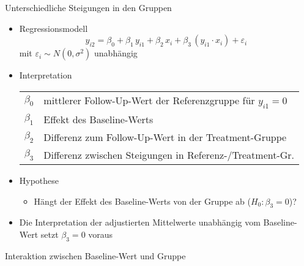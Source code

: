\documentclass{beamer}
\begin{document}
\begin{frame}{Unterschiedliche Steigungen in den Gruppen}
\begin{itemize}
  \item Regressionsmodell
    {\color{iwmorange}\[
      y_{i2} = \beta_0 + \beta_1 \, y_{i1} + \beta_2 \, x_i +
               \beta_3 \, (y_{i1} \cdot x_i) + \varepsilon_i
    \]}
    mit $\varepsilon_i \sim N(0, \sigma^2)$ unabhängig
  \item Interpretation
    \begin{center}
    \begin{tabular}{lp{10cm}}
    $\beta_0$ & mittlerer Follow-Up-Wert der Referenzgruppe für $y_{i1} = 0$\\
    $\beta_1$ & Effekt des Baseline-Werts\\
    $\beta_2$ & Differenz zum Follow-Up-Wert in der Treatment-Gruppe\\
    $\beta_3$ & Differenz zwischen Steigungen in Referenz-/Treatment-Gr.
    \end{tabular}
    \end{center}
  \item Hypothese
    \begin{itemize}
        \item Hängt der Effekt des Baseline-Werts von der Gruppe ab ($H_0\colon \beta_3 = 0$)?
    \end{itemize}
  \item Die Interpretation der adjustierten Mittelwerte unabhängig vom Baseline-Wert setzt $\beta_3 = 0$ voraus
\end{itemize}
\end{frame}


\begin{frame}{Interaktion zwischen Baseline-Wert und Gruppe}
\begin{center}
\end{center}
\end{frame}
\end{document}
